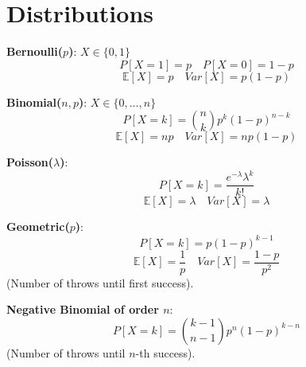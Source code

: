 \section{Distributions}

\begin{definition}
\textbf{Bernoulli($p$)}: $X \in \{0,1\}$
$$P[X=1] = p \quad P[X=0] = 1-p$$
$$\mathbb{E}[X] = p \quad Var[X] = p(1-p)$$
\end{definition}

\begin{definition}
\textbf{Binomial($n, p$)}: $X \in \{0,\dots,n\}$
$$P[X=k] = \binom{n}{k} p^k (1-p)^{n-k}$$
$$\mathbb{E}[X] = np \quad Var[X] = np(1-p)$$
\end{definition}

\begin{definition}
\textbf{Poisson($\lambda$)}:
$$P[X=k] = \frac{e^{-\lambda} \lambda^k}{k!}$$
$$\mathbb{E}[X] = \lambda \quad Var[X] = \lambda$$
\end{definition}

\begin{definition}
\textbf{Geometric($p$)}:
$$P[X=k] = p(1-p)^{k-1}$$
$$\mathbb{E}[X] = \frac{1}{p} \quad Var[X] = \frac{1-p}{p^2}$$
(Number of throws until first success).
\end{definition}

\begin{definition}
\textbf{Negative Binomial of order $n$}:
$$P[X=k] = \binom{k-1}{n-1} p^n (1-p)^{k-n}$$
(Number of throws until $n$-th success).
\end{definition}
